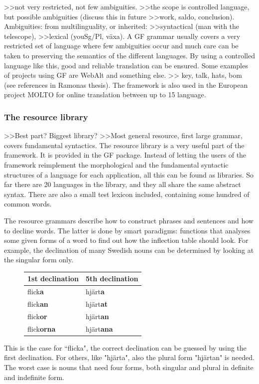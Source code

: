 \documentclass{report}
\begin{document}
>>not very restricted, not few ambiguities.
>>the scope is controlled language, but possible ambiguities (discuss this in future
>>work, saldo, conclusion). Ambiguities: from multilinguality, or inherited:
>>syntactical (man with the telescope), 
>>lexical (youSg/Pl, växa).
A GF grammar usually covers a very restricted set of language where few ambiguities
occur and much care can be taken to preserving the semantics of the
different languages.
By using a controlled language like this,  good and reliable translation can be
ensured. Some examples of projects using GF are WebAlt\cite{webalt} and something else.
>> key, talk, hats, bom (see references in Ramonas thesis).
The framework is also used in the
European project MOLTO\cite{molto} for online translation between up to 15 language.\\

\subsubsection{The resource library}
>>Best part? Biggest library?
>>Most general resource, first large grammar, covers fundamental syntactics.
The resource library\cite{gf-resource} is a very useful part of the framework. It is provided in the 
GF package. %
Instead of letting the users of the framework reimplement the morphological and
the fundamental syntactic structures of a language for each application, all
this can be found as libraries. So far there are 20 languages in the library, and
they all share the same abstract syntax.
There are also a small test lexicon included, containing some hundred of common words.

The resource grammars describe how to construct phrases and sentences and how to
decline words. The latter is done by smart paradigms: functions that analyses
some given forms of a word to find out how the inflection table should look.
For example, the declination of many Swedish nouns can be determined by looking
at the singular form only. 
\begin{figure}
\begin{tabular}{| l | l |}
\hline
1st declination & 5th declination \\
\hline
flick\textbf{a}    &     hjärt\textbf{a}   \\
flick\textbf{an}    &    hjärt\textbf{at}  \\
flick\textbf{or}    &    hjärt\textbf{an}  \\
flick\textbf{orna}  &    hjärt\textbf{ana} \\
\hline
\end{tabular}
\end{figure}
This is the case for ``flicka", the correct declination
can be guessed by using the first declination. %
For others, like "hjärta", also the plural form "hjärtan" is needed.
The worst case is nouns that need four forms, both singular and
plural in definite and indefinite form.
\end{document}
